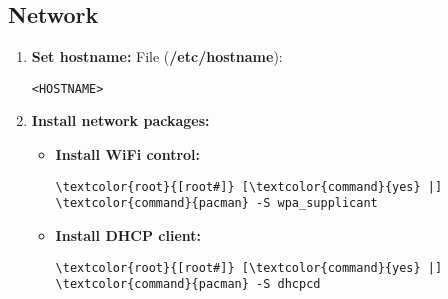 \documentclass[10pt, a4paper, onecolumn, openany]{book} %
\begin{document}
\subsection{Network}
        \begin{enumerate}
            \item \textbf{Set hostname:}
\newline File (\textbf{\textcolor{file}{/etc/hostname}}):
\begin{Verbatim}[commandchars=\\\{\}]
<HOSTNAME>
\end{Verbatim}
            \item \textbf{Install network packages:}
            \begin{itemize}
                \item \textbf{Install WiFi control:}
\begin{Verbatim}[commandchars=\\\{\}]
\textcolor{root}{[root#]} [\textcolor{command}{yes} |] \textcolor{command}{pacman} -S wpa_supplicant
\end{Verbatim}
                \item \textbf{Install DHCP client:}
\begin{Verbatim}[commandchars=\\\{\}]
\textcolor{root}{[root#]} [\textcolor{command}{yes} |] \textcolor{command}{pacman} -S dhcpcd
\end{Verbatim}
            \end{itemize}

    \end{enumerate}
\end{document}
